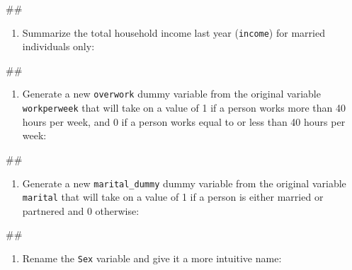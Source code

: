 \documentclass[
]{book}
\newenvironment{Shaded}{\begin{snugshade}}{\end{snugshade}}
\newcommand{\NormalTok}[1]{#1}
\providecommand{\tightlist}{%
  \setlength{\itemsep}{0pt}\setlength{\parskip}{0pt}}
\begin{document}
\begin{Shaded}
\begin{Highlighting}[]
\NormalTok{\#\#}
\end{Highlighting}
\end{Shaded}

\begin{enumerate}
\def\labelenumi{\arabic{enumi}.}
\setcounter{enumi}{1}
\tightlist
\item
  Summarize the total household income last year (\texttt{income}) for married individuals only:
\end{enumerate}

\begin{Shaded}
\begin{Highlighting}[]
\NormalTok{\#\#}
\end{Highlighting}
\end{Shaded}

\begin{enumerate}
\def\labelenumi{\arabic{enumi}.}
\setcounter{enumi}{2}
\tightlist
\item
  Generate a new \texttt{overwork} dummy variable from the original variable \texttt{workperweek} that will take on a value of 1 if a person works more than 40 hours per week, and 0 if a person works equal to or less than 40 hours per week:
\end{enumerate}

\begin{Shaded}
\begin{Highlighting}[]
\NormalTok{\#\#}
\end{Highlighting}
\end{Shaded}

\begin{enumerate}
\def\labelenumi{\arabic{enumi}.}
\setcounter{enumi}{3}
\tightlist
\item
  Generate a new \texttt{marital\_dummy} dummy variable from the original variable \texttt{marital} that will take on a value of 1 if a person is either married or partnered and 0 otherwise:
\end{enumerate}

\begin{Shaded}
\begin{Highlighting}[]
\NormalTok{\#\#}
\end{Highlighting}
\end{Shaded}

\begin{enumerate}
\def\labelenumi{\arabic{enumi}.}
\setcounter{enumi}{4}
\tightlist
\item
  Rename the \texttt{Sex} variable and give it a more intuitive name:
\end{enumerate}
\end{document}
